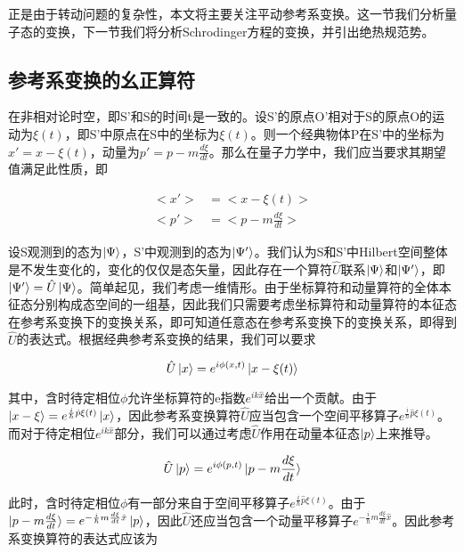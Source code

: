 \documentclass[a4paper]{article}
\begin{document}
        正是由于转动问题的复杂性，本文将主要关注平动参考系变换。这一节我们分析量子态的变换，下一节我们将分析Schrodinger方程的变换，并引出绝热规范势。
        
    \subsection{参考系变换的幺正算符}
    
        在非相对论时空，即S'和S的时间t是一致的。设S'的原点O'相对于S的原点O的运动为$\xi(t)$，即S'中原点在S中的坐标为$\xi(t)$。则一个经典物体P在S'中的坐标为$x'=x-\xi(t)$，动量为$p'=p-m\frac{d\xi}{dt}$。那么在量子力学中，我们应当要求其期望值满足此性质，即
    
        \begin{equation}
            \begin{split}
                <x'>&=<x-\xi(t)>      \\
                <p'>&=<p-m\frac{d\xi}{dt}>
            \end{split}
        \end{equation}
    
        设S观测到的态为$\ket{\Psi}$，S'中观测到的态为$\ket{\Psi'}$。我们认为S和S'中Hilbert空间整体是不发生变化的，变化的仅仅是态矢量，因此存在一个算符$\hat{U}$联系$\ket{\Psi}$和$\ket{\Psi'}$，即$\ket{\Psi'}=\hat{U}\ket{\Psi}$。简单起见，我们考虑一维情形。由于坐标算符和动量算符的全体本征态分别构成态空间的一组基，因此我们只需要考虑坐标算符和动量算符的本征态在参考系变换下的变换关系，即可知道任意态在参考系变换下的变换关系，即得到$\hat{U}$的表达式。根据经典参考系变换的结果，我们可以要求

        \begin{equation}
            \hat{U}\ket{x}=e^{i\phi(x,t)}\ket{x-\xi(t)}
        \end{equation}

        其中，含时待定相位$\phi$允许坐标算符的e指数$e^{ik\hat{x}}$给出一个贡献。由于$\ket{x-\xi}=e^{\frac{i}{\hbar}\hat{p}\xi(t)}\ket{x}$，因此参考系变换算符$\hat{U}$应当包含一个空间平移算子$e^{\frac{i}{\hbar}\hat{p}\xi(t)}$。而对于待定相位$e^{ik\hat{x}}$部分，我们可以通过考虑$\hat{U}$作用在动量本征态$\ket{p}$上来推导。

        \begin{equation}
            \hat{U}\ket{p}=e^{i\phi(p,t)}\ket{p-m\frac{d\xi}{dt}}
        \end{equation}

        此时，含时待定相位$\phi$有一部分来自于空间平移算子$e^{\frac{i}{\hbar}\hat{p}\xi(t)}$。由于$\ket{p-m\frac{d\xi}{dt}}=e^{-\frac{i}{\hbar}m\frac{d\xi}{dt}\hat{x}}\ket{p}$，因此$\hat{U}$还应当包含一个动量平移算子$e^{-\frac{i}{\hbar}m\frac{d\xi}{dt}\hat{x}}$。因此参考系变换算符的表达式应该为
\end{document}
